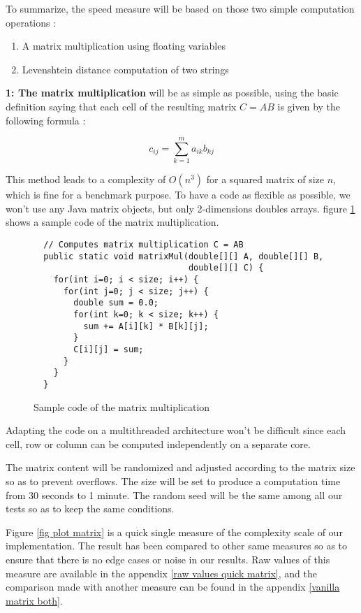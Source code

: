 To summarize, the speed measure will be based on those two simple computation operations :

\begin{enumerate}
  \item A matrix multiplication using floating variables
  \item Levenshtein distance computation of two strings
\end{enumerate}

\textbf{1: The matrix multiplication} will be as simple as possible, using the basic definition saying that each cell of the resulting matrix $C {{=}} AB$ is given by the following formula :

\begin{equation}
	c_{ij} = \sum_{k=1}^m a_{ik} b_{kj}
\end{equation}

This method leads to a complexity of $O(n^3)$ for a squared matrix of size $n$, which is fine for a benchmark purpose. To have a code as flexible as possible, we won't use any Java matrix objects, but only 2-dimensions doubles arrays. figure \ref{listing matrix} shows a sample code of the matrix multiplication.

\begin{figure}[h!]
\begin{lstlisting}
  // Computes matrix multiplication C = AB
  public static void matrixMul(double[][] A, double[][] B, 
                               double[][] C) {
    for(int i=0; i < size; i++) {
      for(int j=0; j < size; j++) {
        double sum = 0.0;
        for(int k=0; k < size; k++) {
          sum += A[i][k] * B[k][j];
        }
        C[i][j] = sum;
      }
    }
  }
\end{lstlisting}
\caption{Sample code of the matrix multiplication}
\label{listing matrix}
\end{figure}

Adapting the code on a multithreaded architecture won't be difficult since each cell, row or column can be computed independently on a separate core.

The matrix content will be randomized and adjusted according to the matrix size so as to prevent overflows. The size will be set to produce a computation time from 30 seconds to 1 minute. The random seed will be the same among all our tests so as to keep the same conditions.

Figure \ref{fig plot matrix} is a quick single measure of the complexity scale of our implementation. The result has been compared to other same measures so as to ensure that there is no edge cases or noise in our results. Raw values of this measure are available in the appendix \ref{raw values quick matrix}, and the comparison made with another measure can be found in the appendix \ref{vanilla matrix both}.

